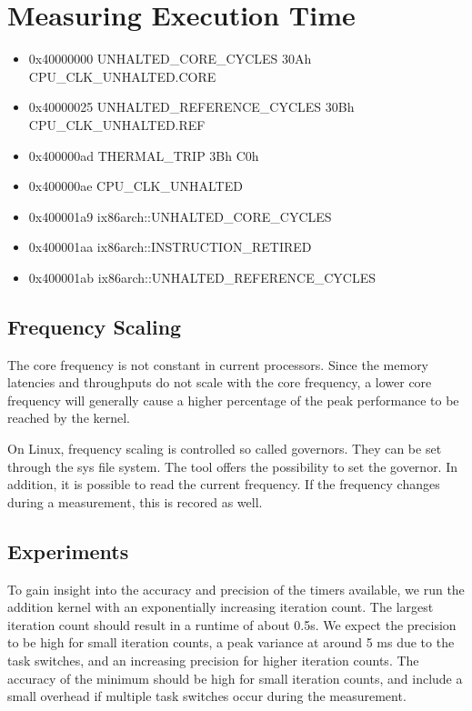 \documentclass[a4paper,12pt]{article}
\begin{document}
\section{Measuring Execution Time}
\begin{itemize}
\item 0x40000000   UNHALTED\_CORE\_CYCLES 30Ah CPU\_CLK\_UNHALTED.CORE
\item 0x40000025   UNHALTED\_REFERENCE\_CYCLES 30Bh CPU\_CLK\_UNHALTED.REF
\item 0x400000ad   THERMAL\_TRIP 3Bh C0h 
\item 0x400000ae   CPU\_CLK\_UNHALTED
\item 0x400001a9   ix86arch::UNHALTED\_CORE\_CYCLES
\item 0x400001aa   ix86arch::INSTRUCTION\_RETIRED
\item 0x400001ab   ix86arch::UNHALTED\_REFERENCE\_CYCLES 
\end{itemize}

\subsection{Frequency Scaling}
The core frequency is not constant in current processors. Since the memory latencies and throughputs do not scale with the core frequency, a lower core frequency will generally cause a higher percentage of the peak performance to be reached by the kernel.

On Linux, frequency scaling is controlled so called governors. They can be set through the sys file system. The tool offers the possibility to set the governor. In addition, it is possible to read the current frequency. If the frequency changes during a measurement, this is recored as well.

\subsection{Experiments}
To gain insight into the accuracy and precision of the timers available, we run the addition kernel with an exponentially increasing iteration count. The largest iteration count should result in a runtime of about 0.5s. We expect the precision to be high for small iteration counts, a peak variance at around 5 ms due to the task switches, and an increasing precision for higher iteration counts. The accuracy of the minimum should be high for small iteration counts, and include a small overhead if multiple task switches occur during the measurement.
\end{document}
